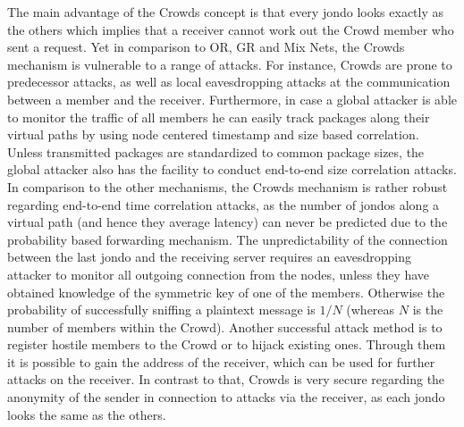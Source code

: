 \documentclass{sig-alternate}
\begin{document}
The main advantage of the Crowds concept is that every jondo looks exactly as the others which implies that a receiver cannot work out the Crowd member who sent a request. Yet in comparison to OR, GR and Mix Nets, the Crowds mechanism is vulnerable to a range of attacks. For instance, Crowds are prone to predecessor attacks, as well as local eavesdropping attacks at the communication between a member and the receiver. Furthermore, in case a global attacker is able to monitor the traffic of all members he can easily track packages along their virtual paths by using node centered timestamp and size based correlation. Unless transmitted packages are standardized to common package sizes, the global attacker also has the facility to conduct end-to-end size correlation attacks. In comparison to the other mechanisms, the Crowds mechanism is rather robust regarding end-to-end time correlation attacks, as the number of jondos along a virtual path (and hence they average latency) can never be predicted due to the probability based forwarding mechanism. The unpredictability of the connection between the last jondo and the receiving server requires an eavesdropping attacker to monitor all outgoing connection from the nodes, unless they have obtained knowledge of the symmetric key of one of the members. Otherwise the probability of successfully sniffing a plaintext message is $1 / N$ (whereas $N$ is the number of members within the Crowd). Another successful attack method is to register hostile members to the Crowd or to hijack existing ones. Through them it is possible to gain the address of the receiver, which can be used for further attacks on the receiver. In contrast to that, Crowds is very secure regarding the anonymity of the sender in connection to attacks via the receiver, as each jondo looks the same as the others. 
\end{document}
